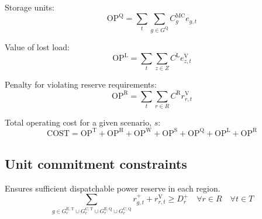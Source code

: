 \documentclass{article}
\newcommand{\sGeneratorsExistingThermal}{G^{\mathrm{E,T}}}
\newcommand{\sGeneratorsCandidateThermal}{G^{\mathrm{C,T}}}
\newcommand{\sStorage}{G^{\mathrm{Q}}}
\newcommand{\sStorageExisting}{G^{\mathrm{E,Q}}}
\newcommand{\sStorageCandidate}{G^{\mathrm{C,Q}}}
\newcommand{\sScenarios}{S}
\newcommand{\sIntervals}{T}
\newcommand{\sZones}{Z}
\newcommand{\sRegions}{R}
\newcommand{\iGenerator}{g}
\newcommand{\iYear}{y}
\newcommand{\iScenario}{s}
\newcommand{\iInterval}{t}
\newcommand{\iZone}{z}
\newcommand{\iRegion}{r}
\newcommand{\cOperatingCost}[1][]{\mathrm{OP}_{#1}}
\newcommand{\cOperatingCostThermal}[1][]{\mathrm{OP}^{\mathrm{T}}_{#1}}
\newcommand{\cOperatingCostHydro}[1][]{\mathrm{OP}^{\mathrm{H}}_{#1}}
\newcommand{\cOperatingCostWind}[1][]{\mathrm{OP}^{\mathrm{W}}_{#1}}
\newcommand{\cOperatingCostSolar}[1][]{\mathrm{OP}^{\mathrm{S}}_{#1}}
\newcommand{\cOperatingCostStorage}[1][]{\mathrm{OP}^{\mathrm{Q}}_{#1}}
\newcommand{\cScenarioDuration}[1][\iYear,\iScenario]{\rho_{#1}}
\newcommand{\cMarginalCost}[1][\iGenerator]{C^{\mathrm{MC}}_{#1}}
\newcommand{\cTotalPresentValue}[1][]{\mathrm{TPV}_{#1}}
\newcommand{\cReserveUpRequirement}[1][\iRegion]{D^{+}_{#1}}
\newcommand{\cOperatingCostLostLoad}[1][]{\mathrm{OP}^{\mathrm{L}}_{#1}}
\newcommand{\cLostLoadCost}{C^{\mathrm{L}}}
\newcommand{\cReserveUpViolationPenalty}{C^{\mathrm{R}}}
\newcommand{\cOperatingCostReserveUpViolation}[1][]{\mathrm{OP}^{\mathrm{R}}_{#1}}
\newcommand{\cEmissionsViolationTotalCost}{\mathrm{PEN}}
\newcommand{\cObjectiveFunction}{\mathrm{COST}}
\newcommand{\cOperatingCostScenario}[1][]{\mathrm{SCEN}_{#1}}
\newcommand{\vEnergy}[1][\iGenerator,\iInterval]{e_{#1}}
\newcommand{\vReserveUp}[1][\iGenerator,\iInterval]{r^{+}_{#1}}
\newcommand{\vReserveUpViolation}[1][\iRegion,\iInterval]{r^{\mathrm{V}}_{#1}}
\newcommand{\vLostLoadEnergy}[1][\iZone,\iInterval]{e^{\mathrm{V}}_{#1}}
\begin{document}
Storage units:
\begin{equation}
\cOperatingCostStorage = \sum\limits_{\iInterval}\sum\limits_{\iGenerator \in \sStorage} \cMarginalCost[\iGenerator] \vEnergy
\end{equation}

Value of lost load:
\begin{equation}
\cOperatingCostLostLoad = \sum\limits_{\iInterval}\sum\limits_{\iZone \in \sZones} \cLostLoadCost \vLostLoadEnergy
\end{equation}

Penalty for violating reserve requirements:
\begin{equation}
\cOperatingCostReserveUpViolation = \sum\limits_{\iInterval}\sum\limits_{\iRegion \in \sRegions} \cReserveUpViolationPenalty \vReserveUpViolation
\end{equation}

Total operating cost for a given scenario, $\iScenario$:
\begin{equation}
\cObjectiveFunction = \cOperatingCostThermal + \cOperatingCostHydro + \cOperatingCostWind + \cOperatingCostSolar + \cOperatingCostStorage + \cOperatingCostLostLoad + \cOperatingCostReserveUpViolation
\end{equation}


%
%
%

\subsection{Unit commitment constraints}
Ensures sufficient dispatchable power reserve in each region.
\begin{equation}
\sum\limits_{\iGenerator \in \sGeneratorsExistingThermal_{\iRegion} \cup \sGeneratorsCandidateThermal_{\iRegion} \cup \sStorageExisting_{\iRegion} \cup \sStorageCandidate_{\iRegion}} \vReserveUp + \vReserveUpViolation \geq \cReserveUpRequirement \quad \forall \iRegion \in \sRegions \quad \forall \iInterval \in \sIntervals
\label{eqn: reserve constraints}
\end{equation}
\end{document}
